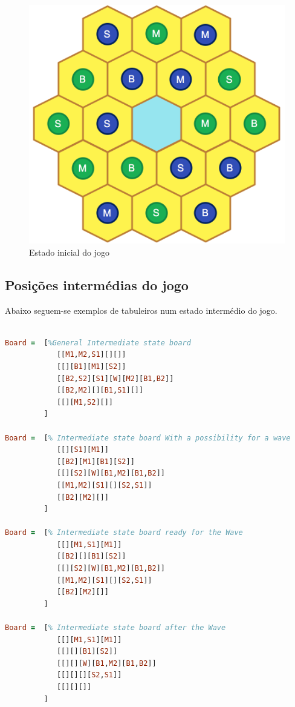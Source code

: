\documentclass[a4paper]{article}
\begin{document}
\begin{figure}[!ht]
	\begin{center}
	\includegraphics[scale=0.29]{init_board.png}
	\caption{Estado inicial do jogo}
    \label{Fig:tabuleiro_inicial}
	\end{center}
\end{figure}

\newpage

\subsection{Posições intermédias do jogo} \label{section:intermedia}

Abaixo seguem-se exemplos de tabuleiros num estado intermédio do jogo.

\begin{lstlisting}[language=Prolog]

Board =  [%General Intermediate state board
    	 	[[M1,M2,S1][][]]
         	[[][B1][M1][S2]]
         	[[B2,S2][S1][W][M2][B1,B2]]
    	 	[[B2,M2][][B1,S1][]]
    	 	[[][M1,S2][]]
     	 ]
         
Board =  [% Intermediate state board With a possibility for a wave
    	 	[[][S1][M1]]
         	[[B2][M1][B1][S2]]
         	[[][S2][W][B1,M2][B1,B2]]
    	 	[[M1,M2][S1][][S2,S1]]
    	 	[[B2][M2][]]
     	 ]
         
Board =  [% Intermediate state board ready for the Wave
    	 	[[][M1,S1][M1]]
         	[[B2][][B1][S2]]
         	[[][S2][W][B1,M2][B1,B2]]
    	 	[[M1,M2][S1][][S2,S1]]
    	 	[[B2][M2][]]
     	 ]
         
Board =  [% Intermediate state board after the Wave
    	 	[[][M1,S1][M1]]
         	[[][][B1][S2]]
         	[[][][W][B1,M2][B1,B2]]
    	 	[[][][][S2,S1]]
    	 	[[][][]]
     	 ]
\end{lstlisting}
\end{document}

